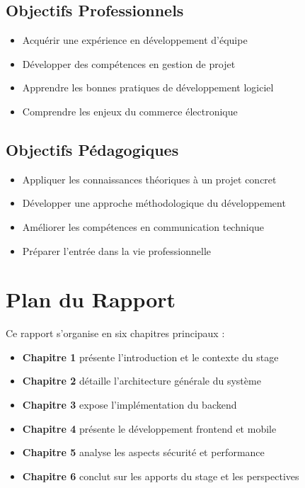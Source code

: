 \documentclass[12pt,a4paper]{report}
\begin{document}
\subsection{Objectifs Professionnels}

\begin{itemize}
    \item Acquérir une expérience en développement d'équipe
    \item Développer des compétences en gestion de projet
    \item Apprendre les bonnes pratiques de développement logiciel
    \item Comprendre les enjeux du commerce électronique
\end{itemize}

\subsection{Objectifs Pédagogiques}

\begin{itemize}
    \item Appliquer les connaissances théoriques à un projet concret
    \item Développer une approche méthodologique du développement
    \item Améliorer les compétences en communication technique
    \item Préparer l'entrée dans la vie professionnelle
\end{itemize}

\section{Plan du Rapport}

Ce rapport s'organise en six chapitres principaux :

\begin{itemize}
    \item \textbf{Chapitre 1} présente l'introduction et le contexte du stage
    \item \textbf{Chapitre 2} détaille l'architecture générale du système
    \item \textbf{Chapitre 3} expose l'implémentation du backend
    \item \textbf{Chapitre 4} présente le développement frontend et mobile
    \item \textbf{Chapitre 5} analyse les aspects sécurité et performance
    \item \textbf{Chapitre 6} conclut sur les apports du stage et les perspectives
\end{itemize}
\end{document}
